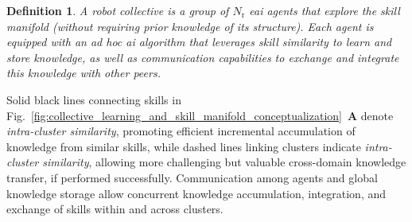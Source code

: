 \documentclass[12pt]{article}
\renewcommand{\emph}[1]{\textit{#1}}
\newtheorem{definition}{Definition}
\begin{document}

\begin{definition}\label{def:robot_collective}
	A \emph{robot collective} is a group of $N_\mathrm{r}$ \ac{eai} agents that explore the skill manifold (without requiring prior knowledge of its structure). Each agent is equipped with an ad hoc \ac{ai} algorithm that leverages skill similarity to learn and store knowledge, as well as communication capabilities to exchange and integrate this knowledge with other peers.
\end{definition}

\noindent Solid black lines connecting skills in Fig.~\ref{fig:collective_learning_and_skill_manifold_conceptualization}~\textbf{A} denote \textit{intra-cluster similarity}, promoting efficient incremental accumulation of knowledge from similar skills, while dashed lines linking clusters indicate \textit{intra-cluster similarity}, allowing more challenging but valuable cross-domain knowledge transfer, if performed successfully. Communication among agents and global knowledge storage allow concurrent knowledge accumulation, integration, and exchange of skills within and across clusters. 
\end{document}
